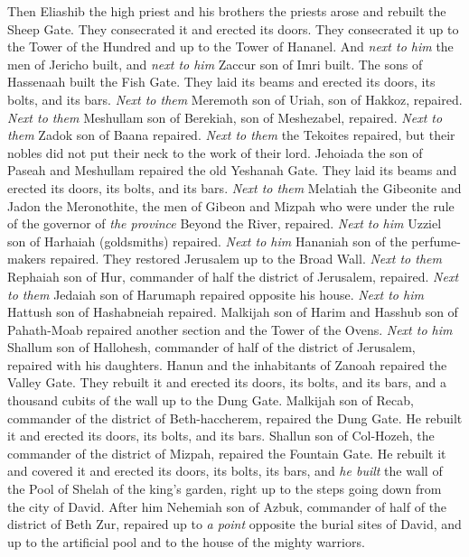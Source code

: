 \begin{biblechapter} %
 Then Eliashib the high priest and his brothers the priests arose and rebuilt the Sheep Gate. They consecrated it and erected its doors. They consecrated it up to the Tower of the Hundred and up to the Tower of Hananel.
\verse And \textit{next to him} the men of Jericho built, and \textit{next to him} Zaccur son of Imri built.
\verse The sons of Hassenaah built the Fish Gate. They laid its beams and erected its doors, its bolts, and its bars.
\verse \textit{Next to them} Meremoth son of Uriah, son of Hakkoz, repaired. \textit{Next to them} Meshullam son of Berekiah, son of Meshezabel, repaired. \textit{Next to them} Zadok son of Baana repaired.
\verse \textit{Next to them} the Tekoites repaired, but their nobles did not put their neck to the work of their lord.
\verse Jehoiada the son of Paseah and Meshullam repaired the old Yeshanah Gate. They laid its beams and erected its doors, its bolts, and its bars.
\verse \textit{Next to them} Melatiah the Gibeonite and Jadon the Meronothite, the men of Gibeon and Mizpah who were under the rule of the governor of \textit{the province} Beyond the River, repaired.
\verse \textit{Next to him} Uzziel son of Harhaiah (goldsmiths) repaired. \textit{Next to him} Hananiah son of the perfume-makers repaired. They restored Jerusalem up to the Broad Wall.
\verse \textit{Next to them} Rephaiah son of Hur, commander of half the district of Jerusalem, repaired.
\verse \textit{Next to them} Jedaiah son of Harumaph repaired opposite his house. \textit{Next to him} Hattush son of Hashabneiah repaired.
\verse Malkijah son of Harim and Hasshub son of Pahath-Moab repaired another section and the Tower of the Ovens.
\verse \textit{Next to him} Shallum son of Hallohesh, commander of half of the district of Jerusalem, repaired with his daughters.
\verse Hanun and the inhabitants of Zanoah repaired the Valley Gate. They rebuilt it and erected its doors, its bolts, and its bars, and a thousand cubits of the wall up to the Dung Gate.
\verse Malkijah son of Recab, commander of the district of Beth-haccherem, repaired the Dung Gate. He rebuilt it and erected its doors, its bolts, and its bars.
\verse Shallun son of Col-Hozeh, the commander of the district of Mizpah, repaired the Fountain Gate. He rebuilt it and covered it and erected its doors, its bolts, its bars, and \textit{he built} the wall of the Pool of Shelah of the king’s garden, right up to the steps going down from the city of David.
\verse After him Nehemiah son of Azbuk, commander of half of the district of Beth Zur, repaired up to \textit{a point} opposite the burial sites of David, and up to the artificial pool and to the house of the mighty warriors.

\end{biblechapter}
